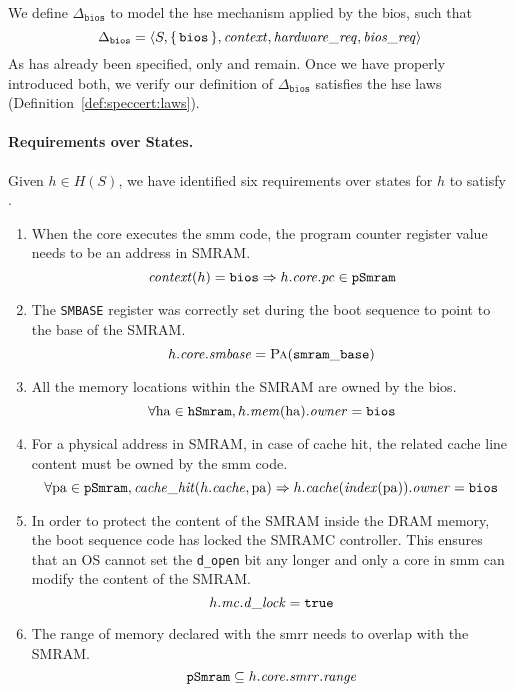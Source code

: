 
We define $\Delta_{\mathtt{bios}}$ to model the \ac{hse} mechanism applied by
the \ac{bios}, such that
\[
  \Delta_{\mathtt{bios}} = \langle S, \{\,\mathtt{bios}\,\},
  \mathit{context}, \mathit{hardware\_req}, \mathit{bios\_req} \rangle
\]
%
As  has already been specified, only  and
 remain.
%
Once we have properly introduced both, we verify our definition of
\( \Delta_{\mathtt{bios}} \) satisfies the \ac{hse} laws
(Definition~\ref{def:speccert:laws}).

\paragraph{Requirements over States.}
%
Given \( h \in H(S) \), we have identified six requirements over states for
\( h \) to satisfy .
%
\begin{enumerate}
\item When the core executes the \ac{smm} code, the program counter register
  value needs to be an address in SMRAM.
  \[
    \mathit{context}(h) = \mathtt{bios} \Rightarrow h.\mathit{core}.\mathit{pc} \in
    \texttt{pSmram}
  \]
\item The \texttt{SMBASE} register was correctly set during the boot sequence to
  point to the base of the SMRAM.
  \[
    h.\mathit{core}.\mathit{smbase} = \textsc{Pa}(\mathtt{smram\_base})
  \]
\item All the memory locations within the SMRAM are owned by the \ac{bios}.
  \[
    \forall \mathrm{ha} \in \texttt{hSmram}, h.\mathit{mem}(\mathrm{ha}).\mathit{owner} =
    \mathtt{bios}
  \]
\item For a physical address in SMRAM, in case of cache hit, the related cache
  line content must be owned by the \ac{smm} code.
  \[
    \forall \mathrm{pa} \in \texttt{pSmram}, \mathit{cache\_hit}(h.\mathit{cache},
    \mathrm{pa}) \Rightarrow h.\mathit{cache}(\mathit{index}(\mathrm{pa})).\mathit{owner} =
    \mathtt{bios}
  \]
\item In order to protect the content of the SMRAM inside the DRAM memory, the
  boot sequence code has locked the SMRAMC controller.
  This ensures that an OS cannot set the \texttt{d\_open} bit any longer and
  only a core in \ac{smm} can modify the content of the SMRAM.
  \[
    h.\mathit{mc}.\mathit{d\_lock} = \mathtt{true}
  \]
\item The range of memory declared with the \ac{smrr} needs to overlap with the
  SMRAM.
  \[
    \texttt{pSmram} \subseteq h.\mathit{core}.\mathit{smrr}.\mathit{range}
  \]
\end{enumerate}

